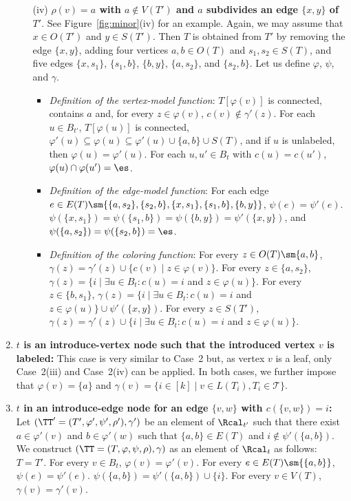 \begin{enumerate}
\begin{itemize}
\medskip
\item[(iv)] \textbf{$\rho(v)=a$ with $a \notin V(T')$ and $a$ subdivides an edge $\{x,y\}$ of $T'$}. See Figure~\ref{fig:minor}(iv) for an example. Again, we may assume that $x \in O(T')$ and $y \in S(T')$.
Then $T$ is obtained from $T'$ by removing the edge $\{x,y\}$,
adding four vertices $a,b \in O(T)$ and $s_1,s_2 \in S(T)$, and five edges $\{x,s_1\}$, $\{s_1,b\}$, $\{b,y\}$, $\{a,s_2\}$, and $\{s_2,b\}$. Let us define $\varphi$, $\psi$, and $\gamma$.
\begin{itemize}
\item \emph{Definition of the vertex-model function}:
$T[\varphi(v)]$ is connected, contains $a$ and, for every $z \in \varphi(v)$, $c(v) \not \in \gamma'(z)$.
For each $u \in B_{t'}$, $T[\varphi(u)]$ is connected,  $\varphi'(u) \subseteq \varphi(u) \subseteq \varphi'(u) \cup \{a,b\} \cup S(T)$, and
 if $u$ is unlabeled, then $\varphi(u) = \varphi'(u)$.
For each $u,u' \in B_{t}$ with $c(u) = c(u')$, $\varphi(u) \cap \varphi(u') = \es$.

\item \emph{Definition of the edge-model function}:
For each edge $e \in E(T) \sm \{\{a,s_2\}, \{s_2,b\}, \{x,s_1\},\{s_1,b\}, \{b,y\}\}$, $\psi(e) = \psi'(e)$.
$\psi(\{x,s_1\}) = \psi(\{s_1,b\}) = \psi(\{b,y\}) = \psi'(\{x,y\})$, and
$\psi(\{a,s_2\}) = \psi(\{s_2,b\}) = \es$.

\item \emph{Definition of the coloring function}:
For every $z \in O(T) \sm \{a,b\}$, $\gamma(z) = \gamma'(z) \cup \{c(v) \mid z \in \varphi(v)\}$.
For every $z \in \{a,s_2\}$, $\gamma(z) = \{i  \mid \exists u \in B_t : c(u) = i$ and $ z \in \varphi(u) \}$.
For every $z  \in \{b,s_1\}$, $\gamma(z) = \{i \mid \exists u \in B_t : c(u) = i$ and $ z \in \varphi(u) \} \cup \psi'(\{x,y\})$.
For every $z \in S(T')$,   $\gamma(z) = \gamma'(z) \cup \{i \mid \exists u \in B_t : c(u) = i$ and $ z \in \varphi(u) \}$.
\end{itemize}
\end{itemize}

\medskip
\item {\bf $t$ is an introduce-vertex node such that the introduced vertex $v$  is labeled:} This case is very similar to Case~2 but, as vertex $v$ is a leaf, only Case~2(iii) and Case~2(iv) can be applied. In both cases, we further impose that  $\varphi(v) = \{a\}$ and $\gamma(v)=\{i\in [k]\mid v\in L(T_i), T_i\in\mathcal{T}\}$.

\medskip
\item {\bf $t$ in an introduce-edge node for an edge $\{v,w\}$ with $c(\{v,w\}) = i$:}
Let $(\TT' = (T',\varphi',\psi',\rho'),\gamma')$ be an element of $\Rcal_{t'}$ such that there exist $a \in \varphi'(v)$ and $b \in \varphi'(w)$ such that $\{a,b\} \in E(T)$ and $ i \not \in \psi'(\{a,b\})$.
We construct $(\TT = (T,\varphi,\psi,\rho),\gamma)$ as an element of $\Rcal_t$ as follows:
 $T = T'$.
For every $v \in B_t$, $\varphi(v) = \varphi'(v)$.
For every $e \in E(T) \sm \{\{a,b\}\}$, $\psi(e) = \psi'(e)$.
$\psi(\{a,b\}) = \psi'(\{a,b\}) \cup \{i\}$.
For every $v \in V(T)$, $\gamma(v) = \gamma'(v)$.


\end{enumerate}
